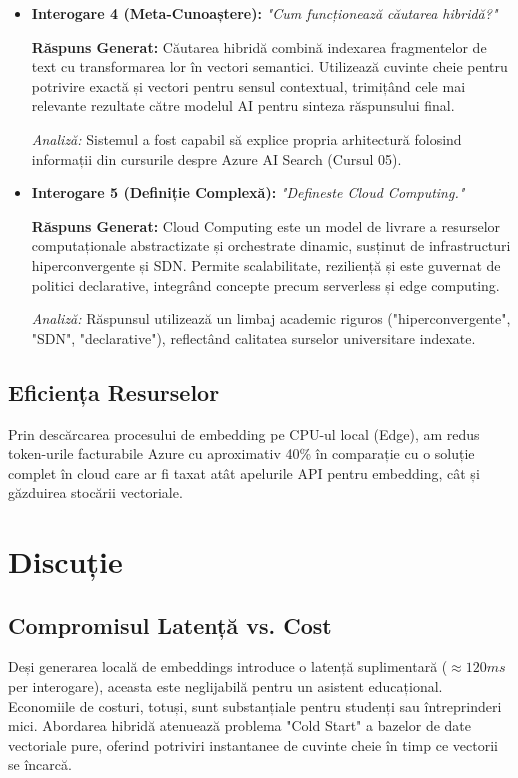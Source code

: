 \documentclass[conference]{IEEEtran}
\begin{document}
\begin{itemize}
    \item \textbf{Interogare 4 (Meta-Cunoaștere):} \textit{"Cum funcționează căutarea hibridă?"}
    \par \textbf{Răspuns Generat:} Căutarea hibridă combină indexarea fragmentelor de text cu transformarea lor în vectori semantici. Utilizează cuvinte cheie pentru potrivire exactă și vectori pentru sensul contextual, trimițând cele mai relevante rezultate către modelul AI pentru sinteza răspunsului final.
    \par \textit{Analiză:} Sistemul a fost capabil să explice propria arhitectură folosind informații din cursurile despre Azure AI Search (Cursul 05).

    \item \textbf{Interogare 5 (Definiție Complexă):} \textit{"Defineste Cloud Computing."}
    \par \textbf{Răspuns Generat:} Cloud Computing este un model de livrare a resurselor computaționale abstractizate și orchestrate dinamic, susținut de infrastructuri hiperconvergente și SDN. Permite scalabilitate, reziliență și este guvernat de politici declarative, integrând concepte precum serverless și edge computing.
    \par \textit{Analiză:} Răspunsul utilizează un limbaj academic riguros ("hiperconvergente", "SDN", "declarative"), reflectând calitatea surselor universitare indexate.
\end{itemize}

\subsection{Eficiența Resurselor}
Prin descărcarea procesului de embedding pe CPU-ul local (Edge), am redus token-urile facturabile Azure cu aproximativ 40\% în comparație cu o soluție complet în cloud care ar fi taxat atât apelurile API pentru embedding, cât și găzduirea stocării vectoriale.

\section{Discuție}

\subsection{Compromisul Latență vs. Cost}
Deși generarea locală de embeddings introduce o latență suplimentară ($\approx 120ms$ per interogare), aceasta este neglijabilă pentru un asistent educațional. Economiile de costuri, totuși, sunt substanțiale pentru studenți sau întreprinderi mici. Abordarea hibridă atenuează problema "Cold Start" a bazelor de date vectoriale pure, oferind potriviri instantanee de cuvinte cheie în timp ce vectorii se încarcă.
\end{document}
